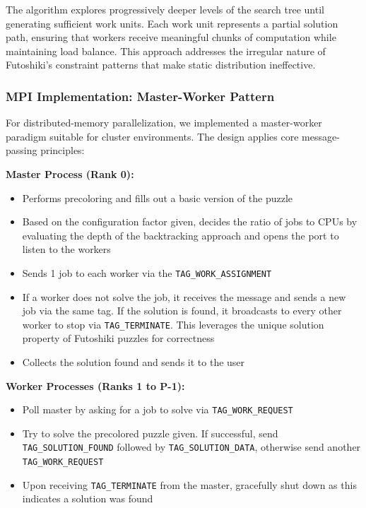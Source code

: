 The algorithm explores progressively deeper levels of the search tree until generating sufficient work units. Each work unit represents a partial solution path, ensuring that workers receive meaningful chunks of computation while maintaining load balance. This approach addresses the irregular nature of Futoshiki's constraint patterns that make static distribution ineffective.

\subsubsection{MPI Implementation: Master-Worker Pattern}
\label{subsubsec:mpi_implementation}
For distributed-memory parallelization, we implemented a master-worker paradigm suitable for cluster environments. The design applies core message-passing principles:
\begin{enumerate}
\textbf{Master Process (Rank 0):}
\begin{itemize}
    \item Performs precoloring and fills out a basic version of the puzzle
    \item Based on the configuration factor given, decides the ratio of jobs to CPUs by evaluating the depth of the backtracking approach and opens the port to listen to the workers
    \item Sends 1 job to each worker via the \texttt{TAG\_WORK\_ASSIGNMENT}
    \item If a worker does not solve the job, it receives the message and sends a new job via the same tag. If the solution is found, it broadcasts to every other worker to stop via \texttt{TAG\_TERMINATE}. This leverages the unique solution property of Futoshiki puzzles for correctness
    \item Collects the solution found and sends it to the user
\end{itemize}

\textbf{Worker Processes (Ranks 1 to P-1):}
\begin{itemize}
    \item Poll master by asking for a job to solve via \texttt{TAG\_WORK\_REQUEST}
    \item Try to solve the precolored puzzle given. If successful, send \texttt{TAG\_SOLUTION\_FOUND} followed by \texttt{TAG\_SOLUTION\_DATA}, otherwise send another \texttt{TAG\_WORK\_REQUEST}
    \item Upon receiving \texttt{TAG\_TERMINATE} from the master, gracefully shut down as this indicates a solution was found
\end{itemize}


\end{enumerate}
